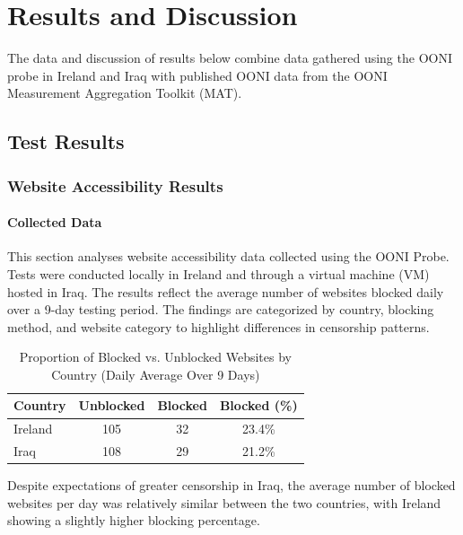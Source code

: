 \chapter{Results and Discussion}

The data and discussion of results below combine data gathered using the OONI probe in Ireland and Iraq with published OONI data from the OONI Measurement Aggregation Toolkit (MAT).

\section{Test Results}

\subsection{Website Accessibility Results}

\subsubsection{Collected Data}

This section analyses website accessibility data collected using the OONI Probe. Tests were conducted locally in Ireland and through a virtual machine (VM) hosted in Iraq. The results reflect the average number of websites blocked daily over a 9-day testing period. The findings are categorized by country, blocking method, and website category to highlight differences in censorship patterns.

\vspace{2em}

\begin{table}[H] 
\centering 
\caption{Proportion of Blocked vs. Unblocked Websites by Country (Daily Average Over 9 Days)} 
\begin{tabular}{lccc} 
\toprule 
\textbf{Country} & \textbf{Unblocked} & \textbf{Blocked} & \textbf{Blocked (\%)} \\
\midrule 
Ireland & 105 & 32 & 23.4\%  \\
Iraq & 108 & 29 & 21.2\% \\
\bottomrule 
\end{tabular} 
\label{tab:blocked_summary} 
\end{table}

Despite expectations of greater censorship in Iraq, the average number of blocked websites per day was relatively similar between the two countries, with Ireland showing a slightly higher blocking percentage. 

